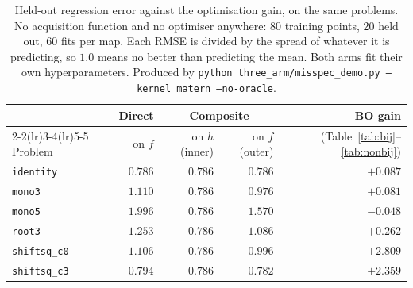 \begin{table}[H]
\centering
\small
\caption{Held-out regression error against the optimisation gain, on the same
problems. No acquisition function and no optimiser anywhere: $80$ training
points, $20$ held out, $60$ fits per map. Each RMSE is divided by the spread of
whatever it is predicting, so $1.0$ means no better than predicting the mean.
Both arms fit their own hyperparameters. Produced by
\texttt{python three\_arm/misspec\_demo.py --kernel matern --no-oracle}.}
\label{tab:rmse}
\begin{tabular}{l r r r r}
\toprule
 & Direct & \multicolumn{2}{c}{Composite} & BO gain \\
\cmidrule(lr){2-2}\cmidrule(lr){3-4}\cmidrule(lr){5-5}
Problem & on $f$ & on $h$ (inner) & on $f$ (outer) & (Table~\ref{tab:bij}--\ref{tab:nonbij}) \\
\midrule
\texttt{identity} & $0.786$ & $0.786$ & $0.786$ & $+0.087$ \\
\texttt{mono3} & $1.110$ & $0.786$ & $\mathbf{0.976}$ & $+0.081$ \\
\texttt{mono5} & $1.996$ & $0.786$ & $\mathbf{1.570}$ & $-0.048$ \\
\texttt{root3} & $1.253$ & $0.786$ & $\mathbf{1.086}$ & $+0.262$ \\
\midrule
\texttt{shiftsq\_c0} & $1.106$ & $0.786$ & $\mathbf{0.996}$ & $+2.809$ \\
\texttt{shiftsq\_c3} & $0.794$ & $0.786$ & $0.782$ & $+2.359$ \\
\bottomrule
\end{tabular}
\end{table}
